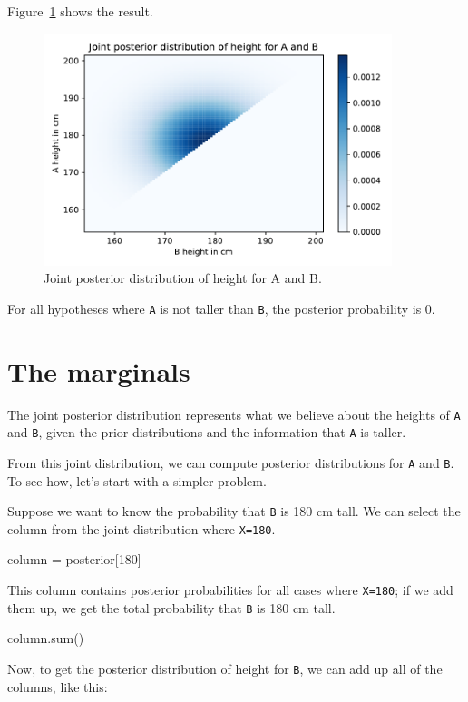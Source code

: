 \documentclass[12pt]{book}
\theoremstyle{exercise}
\newcommand{\py}[1]{{\tt #1}}%
\begin{document}
Figure~\ref{fig09-03} shows the result.

\begin{figure}
\centerline{\includegraphics[width=4in]{figs/fig09-03.pdf}}
\caption{Joint posterior distribution of height for A and B.}
\label{fig09-03}
\end{figure}

For all hypotheses where \py{A} is not taller than \py{B}, the posterior probability is 0.


\section{The marginals}
\label{marginals}

The joint posterior distribution represents what we believe about the heights of \py{A} and \py{B}, given the prior distributions and the information that \py{A} is taller.

From this joint distribution, we can compute posterior distributions for \py{A} and \py{B}.  To see how, let's start with a simpler problem.

Suppose we want to know the probability that \py{B} is 180 cm tall.  We can select the column from the joint distribution where \py{X=180}.

\begin{code}
column = posterior[180]
\end{code}

This column contains posterior probabilities for all cases where \py{X=180}; if we add them up, we get the total probability that \py{B} is 180 cm tall.

\begin{code}
column.sum()
\end{code}

Now, to get the posterior distribution of height for \py{B}, we can add up all of the columns, like this:
\end{document}
